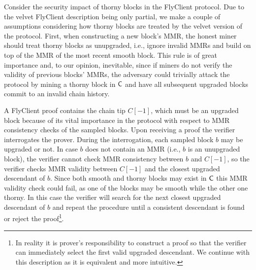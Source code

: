 	Consider the security impact of thorny blocks in the FlyClient protocol.
	Due to the velvet FlyClient description being only partial, we
	make a couple of assumptions considering how thorny blocks are treated by the velvet version of the protocol.
	First, when constructing a new block's MMR, the honest miner should treat thorny blocks as unupgraded, 
	i.e., ignore invalid MMRs and build on top of the MMR of the most recent smooth block. 
	This rule is of great importance and, to our opinion, inevitable, since if miners do not verify the 
	validity of previous blocks' MMRs, the adversary could trivially attack the protocol by mining a thorny block in $\mathsf{C}$ and have all subsequent upgraded
	blocks commit to an invalid chain history.  
	
	A FlyClient proof contains the chain tip $C[-1]$, which must be an upgraded block because of its vital importance in the protocol with respect to MMR consistency checks of the sampled blocks. 
	Upon receiving a proof the verifier interrogates the prover. During the interrogation, each sampled block $b$ may
	be upgraded or not. In case $b$ does not contain an MMR (i.e., $b$ is an unupgraded block), the verifier cannot check MMR consistency
	between $b$ and $C[-1]$, so the verifier checks MMR validity between $C[-1]$ and the closest upgraded descendant of $b$.
	Since both smooth and thorny blocks may exist in $\mathsf{C}$ this MMR validity check could fail, as one of the blocks may be smooth while the other one thorny.
	In this case the verifier will search for the next closest upgraded descendant of $b$ and repeat the procedure until a consistent descendant is found or reject 
	the proof\footnote{
	In reality it is prover's responsibility to construct a proof so that the verifier can immediately select the first valid upgraded descendant. We continue 
	with this description as it is equivalent and more intuitive.
	}.

